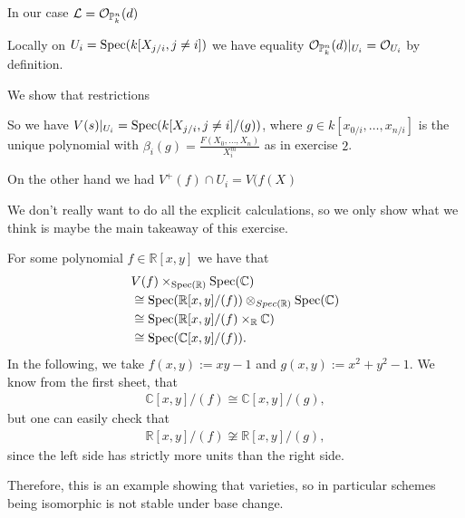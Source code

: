 \begin{exercise}{3}
\begin{enumerate}
{                In our case $\mathcal{L} = \mathcal{O}_{\mathbb{P}^n_k}(d)$

                Locally on $U_i = \operatorname{Spec}(k[X_{j/i}, j \not= i])$ we have equality
                $\mathcal{O}_{\mathbb{P}^n_k}(d)|_{U_i} = \mathcal{O}_{U_i}$ by
                definition.

                We show that restrictions 
                 
                So we have $V(s)|_{U_i} = \operatorname{Spec}(k[X_{j/i}, j \not= i] / (g))$,
                where $g \in k[x_{0/i}, \dots, x_{n/i}]$ is the unique
                polynomial with $\beta_i(g) = \frac{F(X_0, \dots, X_n)}{X^m_i}$
                as in exercise $2$.

                On the other hand we had $V^+(f) \cap U_i = V(f(X_{})$
            }
    \end{enumerate}
\end{exercise}

\begin{exercise}{4}
    We don't really want to do all the explicit calculations, so we only show what we think
    is maybe the main takeaway of this exercise.

    For some polynomial $f\in \mathbb{R}[x,y]$ we have that 
    \begin{align*}
        &V(f) \times_{\operatorname{Spec}(\mathbb{R})} \operatorname{Spec}(\mathbb{C})\\
        &\cong \operatorname{Spec}(\mathbb{R}[x,y]/(f)) \otimes_{Spec(\mathbb{R})}\operatorname{Spec}(\mathbb{C})\\
        &\cong \operatorname{Spec}(\mathbb{R}[x,y]/(f)\times_\mathbb{R} \mathbb{C})\\
        &\cong \operatorname{Spec}(\mathbb{C}[x,y]/(f)).
    \end{align*}
    In the following, we take $f(x,y):=xy-1$ and $g(x,y):=x^2+y^2-1$. We know from 
    the first sheet, that 
    \begin{align*}
        \mathbb{C}[x,y]/(f)\cong \mathbb{C}[x,y]/(g),
    \end{align*}
    but one can easily check that
    \begin{align*}
        \mathbb{R}[x,y]/(f) \not \cong \mathbb{R}[x,y]/(g),
    \end{align*}
    since the left side has strictly more units than the right side.

    Therefore, this is an example showing that varieties, so in particular schemes being isomorphic 
    is not stable under base change.
\end{exercise}



